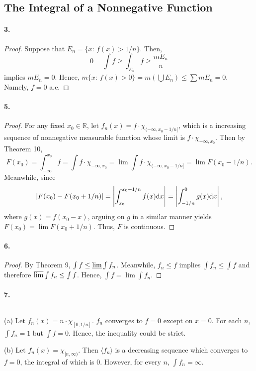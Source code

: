 \subsection{The Integral of a Nonnegative Function}
  \paragraph{3.}
  \begin{proof}
    Suppose that $E_n=\{x:\, f(x)>1/n\}$. Then, 
    \[
      0=\int f \ge \int_{E_n} f \ge \frac{mE_n}{n}
    \]
    implies $mE_n=0$. Hence, $m\{x:\, f(x)>0\}=m(\bigcup E_n)\le\sum mE_n=0$. 
    Namely, $f=0$ a.e.
  \end{proof}

  \paragraph{5.}
  \begin{proof}
    For any fixed $x_0\in\mathbb{R}$, let $f_n(x) = f\cdot\chi_{(-\infty,x_0-
    1/n]}$, which is a increasing sequence of nonnegative measurable function
    whose limit is $f\cdot\chi_{-\infty,x_0}$. Then by Theorem 10, 
    \[
      F(x_0)=\int_{-\infty}^{x_0} f = \int f\cdot\chi_{-\infty,x_0}
      = \lim\int f\cdot\chi_{(-\infty,x_0-1/n]} = \lim F(x_0-1/n).
    \]
    Meanwhile, since 
    \[
      |F(x_0)-F(x_0+1/n)| = \left|\int_{x_0}^{x_0+1/n}f(x)\mathrm{d} x\right|=
      \left|\int_{-1/n}^0 g(x)\mathrm{d} x \right|,
    \]
    where $g(x)=f(x_0-x)$, arguing on $g$ in a similar manner yields $F(x_0)=
    \lim F(x_0+1/n)$. Thus, $F$ is continuous.
  \end{proof}

  \paragraph{6.}
  \begin{proof}
    By Theorem 9, $\int f \le \operatorname*{\underline{lim}}\int f_n$. Meanwhile, $f_n\le f$ implies
    $\int f_n\le \int f$ and therefore $\operatorname*{\overline{lim}} \int f_n \le \int f$. Hence, 
    $\int f =\lim\int f_n$.
  \end{proof}

  \paragraph{7.}
  \begin{solution}
    $\,$\par
    (a) Let $f_n(x)=n\cdot\chi_{[0,1/n]}$. $f_n$ converges to $f=0$ except on 
    $x=0$. For each $n$, $\int f_n = 1$ but $\int f=0$. Hence, the inequality
    could be strict.\par
    (b) Let $f_n(x)=\chi_{[n,\infty)}$. Then $\langle f_n\rangle$ is a 
    decreasing sequence which converges to $f=0$, the integral of which is $0$.
    However, for every $n$, $\int f_n = \infty$.
  \end{solution}

